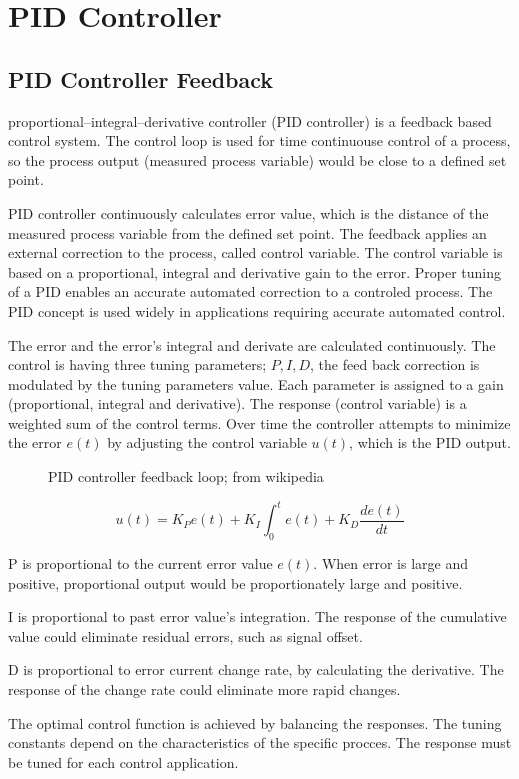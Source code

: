 \documentclass[\main/master.tex]{subfiles}
\begin{document}
\section{PID Controller}
\subsection{PID Controller Feedback}
proportional–integral–derivative controller (PID controller) is a feedback based control system. The control loop is used for time continuouse control of a process, so the process output (measured process variable) would be close to a defined set point.
\par
PID controller continuously calculates error value, which is the distance of the measured process variable from the defined set point. The feedback applies an external correction to the process, called control variable. The control variable is based on a proportional, integral and derivative gain to the error. Proper tuning of a PID enables an accurate automated correction to a controled process. The PID concept is used widely in applications requiring accurate automated control.



\par
The error and the error's integral and derivate are calculated continuously. The control is having three tuning parameters; $P, I, D$, the feed back correction is modulated by the tuning parameters value. Each parameter is assigned to a gain (proportional, integral and derivative). The response (control variable) is a weighted sum of the control terms. Over time the controller attempts to minimize the error $e(t)$ by adjusting the control variable $u(t)$, which is the PID output.
\par
\begin{figure}[htbp]
	\centering
	\caption[PID]{PID controller feedback loop; from wikipedia}
	\label{fig:PID_scheme}
\end{figure}
\begin{equation}
u(t) = K_Pe(t)+K_I\int_{0}^{t}e(t)+K_D\frac{de(t)}{dt}   \label{eqn:PID_eq}
\end{equation}


P is proportional to the current error value $e(t)$. When error is large and positive, proportional output would be proportionately large and positive.
\par
I is proportional to past error value's integration. The response of the cumulative value could eliminate residual errors, such as signal offset.
\par
D is proportional to error current change rate, by calculating the derivative. The response of the change rate could eliminate more rapid changes.
\par
The optimal control function is achieved by balancing the responses. The tuning constants depend on the characteristics of the specific procces. The response must be tuned for each control application.  
\end{document}
